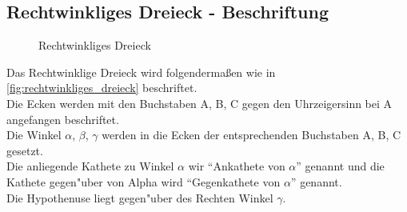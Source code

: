 \documentclass{standalone}
\begin{document}
\subsection{Rechtwinkliges Dreieck - Beschriftung}
\begin{figure}[hb!]
  \centering
  \def\svgwidth{200px}
  
  \caption{Rechtwinkliges Dreieck}
  \label{fig:rechtwinkliges_dreieck}
\end{figure}
\noindent
Das Rechtwinklige Dreieck wird folgenderma{\ss}en wie in \autoref{fig:rechtwinkliges_dreieck} beschriftet. \\
Die Ecken werden mit den Buchstaben A, B, C gegen den Uhrzeigersinn bei A angefangen beschriftet. \\
Die Winkel $\alpha$, $\beta$, $\gamma$ werden in die Ecken der entsprechenden Buchstaben A, B, C gesetzt. \\
Die anliegende Kathete zu Winkel $\alpha$ wir "`Ankathete von $\alpha$"' genannt und die Kathete gegen{"u}ber von Alpha wird "`Gegenkathete von $\alpha$"' genannt. \\
Die Hypothenuse liegt gegen{"u}ber des Rechten Winkel $\gamma$.
\end{document}
